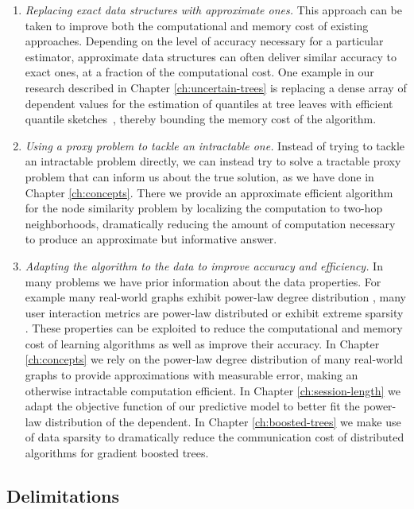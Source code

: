 \begin{enumerate}
	\item \emph{Replacing exact data structures with approximate ones.} This approach can be taken
	to improve both the computational and memory cost of existing approaches. Depending on the
	level of accuracy necessary for a particular estimator, approximate data structures
	can often deliver similar accuracy to exact ones, at a fraction of the computational cost.
	One example in our research described in Chapter \ref{ch:uncertain-trees} is replacing a dense array of dependent values for the
	estimation of quantiles at tree leaves with efficient quantile sketches~\cite{karnin2016kll}, thereby bounding the
	memory cost of the algorithm.
	\item \emph{Using a proxy problem to tackle an intractable one.} Instead of trying to
	tackle an intractable problem directly, we can instead try to solve a
	tractable proxy problem that can inform us about the true solution, as we have done
	in Chapter \ref{ch:concepts}. There we provide an approximate efficient algorithm for the node similarity problem by localizing the computation to two-hop neighborhoods, dramatically reducing the
	amount of computation necessary to produce an approximate but informative answer.
	\item \emph{Adapting the algorithm to the data to improve accuracy and efficiency.} In many problems
	we have prior information about the data properties. For example many real-world graphs exhibit
	power-law degree distribution \cite{small-world, barabasi-small-world}, many user interaction metrics are power-law
	distributed \cite{phonecalls, faloutsos1999internet, click-stream-power-law} or exhibit extreme sparsity \cite{esl}. These properties can
	be exploited to reduce the computational and memory cost of learning algorithms as well as
	improve their accuracy. In Chapter \ref{ch:concepts} we rely on the power-law degree
	distribution of many real-world graphs to provide approximations with measurable error,
	making an otherwise intractable computation efficient. In Chapter \ref{ch:session-length}
	we adapt the objective function of our predictive model to better fit the power-law distribution of the dependent.
	In Chapter \ref{ch:boosted-trees} we make use of data sparsity to dramatically reduce
	the communication cost of distributed algorithms for gradient boosted trees.
\end{enumerate}

\subsection{Delimitations}


